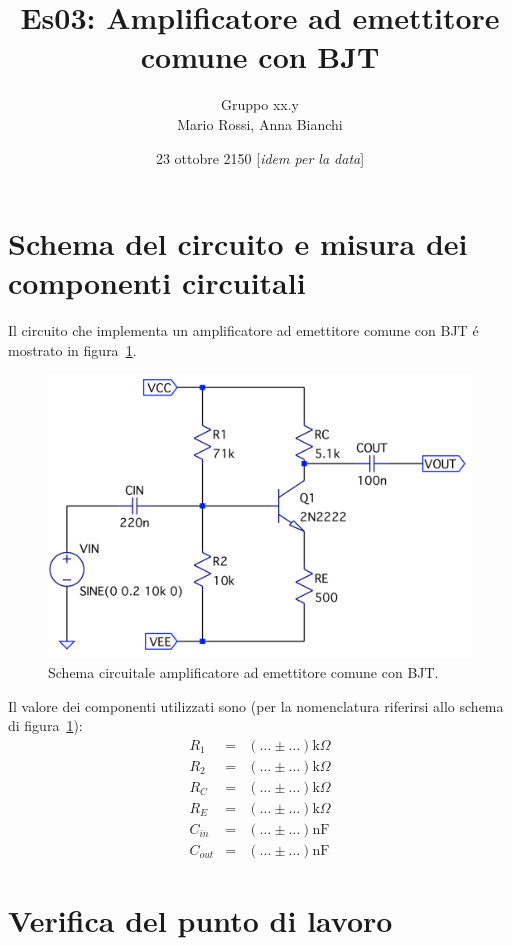 \documentclass[10pt,a4paper]{article}
\author{Gruppo xx.y \\ Mario Rossi, Anna Bianchi \rem{non dimenticate i nomi}}
\title{Es03: Amplificatore ad emettitore comune con BJT}
\newcommand{\rem}[1]{[\emph{#1}]}
\begin{document}
\date{23 ottobre 2150 \rem{idem per la data}}
\maketitle

\section*{Schema del circuito e misura dei componenti circuitali}
Il circuito che implementa un amplificatore ad emettitore comune con BJT \'e mostrato in figura~\ref{fig:circuit}.
\begin{figure}[htp]
\begin{center}
\includegraphics[scale=0.5]{AmplBJT-B.png}
\caption{Schema circuitale amplificatore ad emettitore comune con BJT.}
\label{fig:circuit}
\end{center}
\end{figure}
Il valore dei componenti utilizzati sono (per la nomenclatura riferirsi allo schema di figura~\ref{fig:circuit}):
\[
\begin{array}{rcl}
R_1 &=& (\ldots \pm \ldots) \mathrm{k}\Omega\\
R_2 &=& (\ldots \pm \ldots) \mathrm{k}\Omega\\
R_C &=& (\ldots \pm \ldots) \mathrm{k}\Omega\\
R_E &=& (\ldots \pm \ldots) \mathrm{k}\Omega\\
C_{in} &=& (\ldots \pm \ldots) \mathrm{nF}\\
C_{out} &=& (\ldots \pm \ldots) \mathrm{nF}
\end{array}
\]


\setcounter{section}{0}
\section{Verifica del punto di lavoro}
\end{document}
